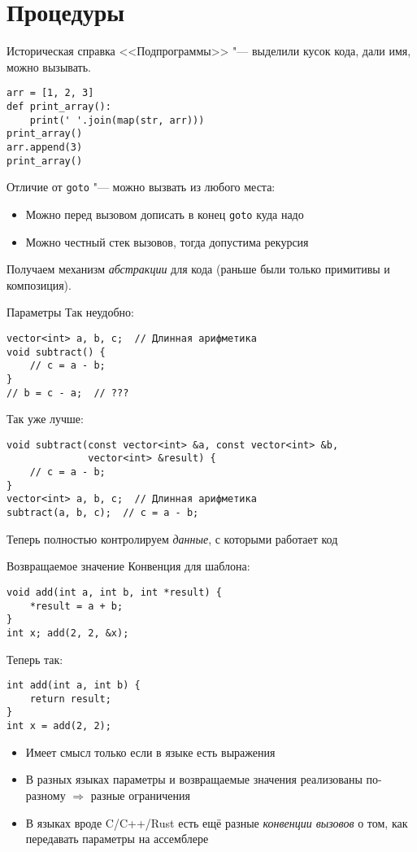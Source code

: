 \section{Процедуры}
\begin{frame}[t,fragile]{Историческая справка}
	<<Подпрограммы>> "--- выделили кусок кода, дали имя, можно вызывать.
\begin{verbatim}
arr = [1, 2, 3]
def print_array():
    print(' '.join(map(str, arr)))
print_array()
arr.append(3)
print_array()
\end{verbatim}
	Отличие от \verb`goto` "--- можно вызвать из любого места:
	\begin{itemize}
	\item Можно перед вызовом дописать в конец \verb`goto` куда надо
	\item Можно честный стек вызовов, тогда допустима рекурсия
	\end{itemize}
	
	Получаем механизм \textit{абстракции} для кода
	(раньше были только примитивы и композиция).
\end{frame}

\begin{frame}[t,fragile]{Параметры}
	Так неудобно:
\begin{verbatim}
vector<int> a, b, c;  // Длинная арифметика
void subtract() {
	// c = a - b;
}
// b = c - a;  // ???
\end{verbatim}

	Так уже лучше:
\begin{verbatim}
void subtract(const vector<int> &a, const vector<int> &b,
              vector<int> &result) {
	// c = a - b;
}
vector<int> a, b, c;  // Длинная арифметика
subtract(a, b, c);  // c = a - b;
\end{verbatim}
	Теперь полностью контролируем \textit{данные}, с которыми работает код
\end{frame}

\begin{frame}[t,fragile]{Возвращаемое значение}
	Конвенция для шаблона:
\begin{verbatim}
void add(int a, int b, int *result) {
    *result = a + b;
}
int x; add(2, 2, &x);
\end{verbatim}
	Теперь так:
\begin{verbatim}
int add(int a, int b) {
    return result;
}
int x = add(2, 2);
\end{verbatim}
	\begin{itemize}
	\item Имеет смысл только если в языке есть выражения
	\item
		В разных языках параметры и возвращаемые значения
		реализованы по-разному $\Rightarrow$ разные ограничения
	\item
		В языках вроде C/C++/Rust есть ещё разные \textit{конвенции вызовов}
		о том, как передавать параметры на ассемблере
	\end{itemize}
\end{frame}

